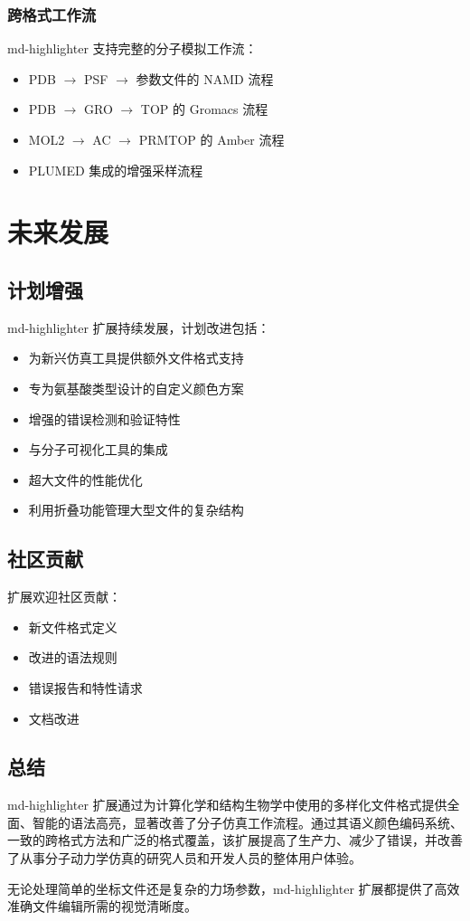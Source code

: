 \subsubsection{跨格式工作流}
md-highlighter 支持完整的分子模拟工作流：
\begin{itemize}
    \item PDB $\to$ PSF $\to$ 参数文件的 NAMD 流程
    \item PDB $\to$ GRO $\to$ TOP 的 Gromacs 流程  
    \item MOL2 $\to$ AC $\to$ PRMTOP 的 Amber 流程
    \item PLUMED 集成的增强采样流程
\end{itemize}

\section{未来发展}

\subsection{计划增强}

md-highlighter 扩展持续发展，计划改进包括：

\begin{itemize}
    \item 为新兴仿真工具提供额外文件格式支持
    \item 专为氨基酸类型设计的自定义颜色方案
    \item 增强的错误检测和验证特性
    \item 与分子可视化工具的集成
    \item 超大文件的性能优化
    \item 利用折叠功能管理大型文件的复杂结构
\end{itemize}

\subsection{社区贡献}

扩展欢迎社区贡献：
\begin{itemize}
    \item 新文件格式定义
    \item 改进的语法规则
    \item 错误报告和特性请求
    \item 文档改进
\end{itemize}

\subsection{总结}

md-highlighter 扩展通过为计算化学和结构生物学中使用的多样化文件格式提供全面、智能的语法高亮，显著改善了分子仿真工作流程。通过其语义颜色编码系统、一致的跨格式方法和广泛的格式覆盖，该扩展提高了生产力、减少了错误，并改善了从事分子动力学仿真的研究人员和开发人员的整体用户体验。

无论处理简单的坐标文件还是复杂的力场参数，md-highlighter 扩展都提供了高效准确文件编辑所需的视觉清晰度。
